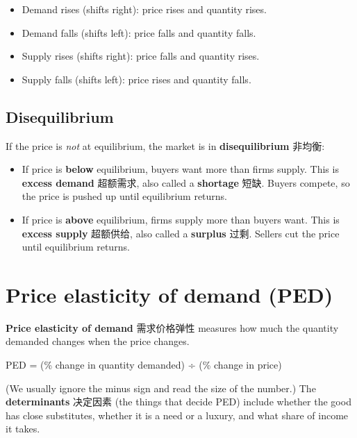 \documentclass[11pt]{article}
\begin{document}
\begin{itemize}
\item Demand rises (shifts right): price rises and quantity rises.

\item Demand falls (shifts left): price falls and quantity falls.

\item Supply rises (shifts right): price falls and quantity rises.

\item Supply falls (shifts left): price rises and quantity falls.

\end{itemize}

\subsection*{Disequilibrium}

If the price is \emph{not} at equilibrium, the market is in \textbf{disequilibrium} 非均衡:

\begin{itemize}
\item If price is \textbf{below} equilibrium, buyers want more than firms supply. This is \textbf{excess demand} 超额需求, also called a \textbf{shortage} 短缺. Buyers compete, so the price is pushed up until equilibrium returns.

\item If price is \textbf{above} equilibrium, firms supply more than buyers want. This is \textbf{excess supply} 超额供给, also called a \textbf{surplus} 过剩. Sellers cut the price until equilibrium returns.

\end{itemize}

\section*{Price elasticity of demand (PED)}

\textbf{Price elasticity of demand} 需求价格弹性 measures how much the quantity demanded changes when the price changes.

PED = (\% change in quantity demanded) ÷ (\% change in price)

(We usually ignore the minus sign and read the size of the number.) The \textbf{determinants} 决定因素 (the things that decide PED) include whether the good has close substitutes, whether it is a need or a luxury, and what share of income it takes.
\end{document}
